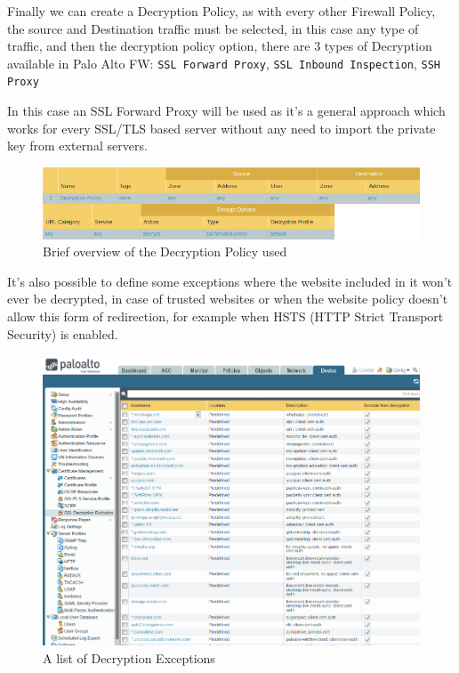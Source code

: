 \newpage

Finally we can create a Decryption Policy, as with every other Firewall Policy, the source and Destination traffic must be selected, in this case any type of traffic, and then the decryption policy option, there are 3 types of Decryption available in Palo Alto FW: \verb|SSL Forward Proxy|, \verb|SSL Inbound Inspection|, \verb|SSH Proxy|

In this case an SSL Forward Proxy will be used as it's a general approach which works for every SSL/TLS based server without any need to import the private key from external servers.

\begin{figure}[!hb]
\centering
 \includegraphics[width=13cm]{img/decryption_policy.png}
	\caption{Brief overview of the Decryption Policy used}\label{Decryption Policy}
\end{figure}

It's also possible to define some exceptions where the website included in it won't ever be decrypted, in case of trusted websites or when the website policy doesn't allow this form of redirection, for example when HSTS (HTTP Strict Transport Security) is enabled.

\begin{figure}[!h]
\centering
 \includegraphics[width=12cm]{img/decryption_exceptions.png}
	\caption{A list of Decryption Exceptions}\label{Decryption Exceptions}
\end{figure}

